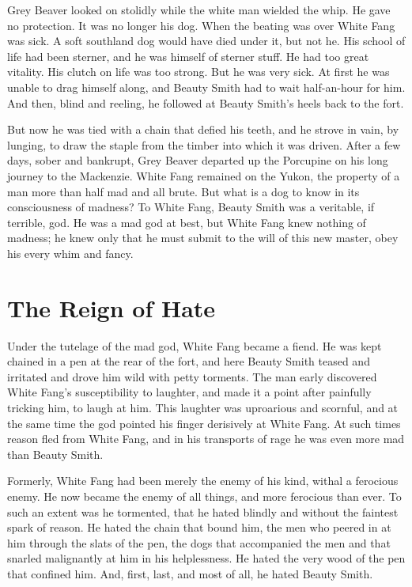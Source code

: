 \documentclass[10pt]{book}
\begin{document}
Grey Beaver looked on stolidly while the white man wielded the whip. He
gave no protection. It was no longer his dog. When the beating was over
White Fang was sick. A soft southland dog would have died under it, but
not he. His school of life had been sterner, and he was himself of
sterner stuff. He had too great vitality. His clutch on life was too
strong. But he was very sick. At first he was unable to drag himself
along, and Beauty Smith had to wait half-an-hour for him. And then,
blind and reeling, he followed at Beauty Smith’s heels back to the
fort.

But now he was tied with a chain that defied his teeth, and he strove
in vain, by lunging, to draw the staple from the timber into which it
was driven. After a few days, sober and bankrupt, Grey Beaver departed
up the Porcupine on his long journey to the Mackenzie. White Fang
remained on the Yukon, the property of a man more than half mad and all
brute. But what is a dog to know in its consciousness of madness? To
White Fang, Beauty Smith was a veritable, if terrible, god. He was a
mad god at best, but White Fang knew nothing of madness; he knew only
that he must submit to the will of this new master, obey his every whim
and fancy.

\chapter{The Reign of Hate}

Under the tutelage of the mad god, White Fang became a fiend. He was
kept chained in a pen at the rear of the fort, and here Beauty Smith
teased and irritated and drove him wild with petty torments. The man
early discovered White Fang’s susceptibility to laughter, and made it a
point after painfully tricking him, to laugh at him. This laughter was
uproarious and scornful, and at the same time the god pointed his
finger derisively at White Fang. At such times reason fled from White
Fang, and in his transports of rage he was even more mad than Beauty
Smith.

Formerly, White Fang had been merely the enemy of his kind, withal a
ferocious enemy. He now became the enemy of all things, and more
ferocious than ever. To such an extent was he tormented, that he hated
blindly and without the faintest spark of reason. He hated the chain
that bound him, the men who peered in at him through the slats of the
pen, the dogs that accompanied the men and that snarled malignantly at
him in his helplessness. He hated the very wood of the pen that
confined him. And, first, last, and most of all, he hated Beauty Smith.
\end{document}
